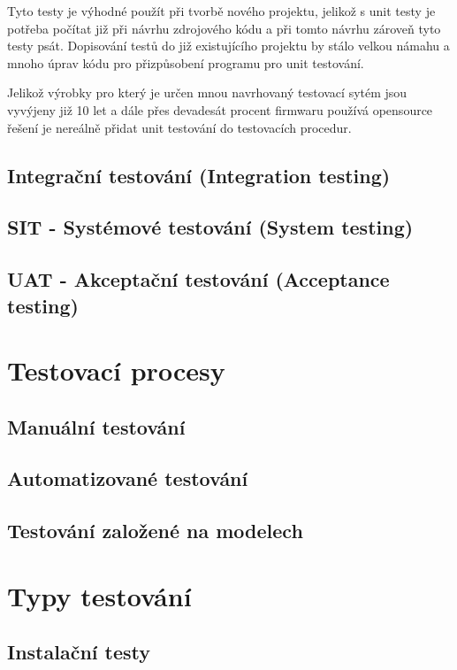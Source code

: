 Tyto testy je výhodné použít při tvorbě nového projektu, jelikož s unit testy je potřeba počítat již při návrhu zdrojového kódu a při tomto návrhu zároveň tyto testy psát. Dopisování testů do již existujícího projektu by stálo velkou námahu a mnoho úprav kódu pro přizpůsobení programu pro unit testování.

Jelikož výrobky pro který je určen mnou navrhovaný testovací sytém jsou vyvýjeny již 10 let a dále přes devadesát procent firmwaru používá opensource řešení je nereálně přidat unit testování do testovacích procedur.


\subsection{Integrační testování (Integration testing)}


\subsection{SIT - Systémové testování (System testing)}


\subsection{UAT - Akceptační testování (Acceptance testing)}


\section{Testovací procesy}
\subsection{Manuální testování}
\subsection{Automatizované testování}
\subsection{Testování založené na modelech}


\section{Typy testování}

\subsection{Instalační testy}
